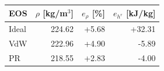 \begin{tabular}{lrrr}
\toprule
EOS & $\rho$ [kg/m$^3$] & $e_\rho$ [\%] & $e_{h^r}$ [kJ/kg] \\
\midrule
Ideal & 224.62 & +5.68 & +32.31 \\
VdW & 222.96 & +4.90 & -5.89 \\
PR & 218.55 & +2.83 & -4.00 \\
\bottomrule
\end{tabular}
